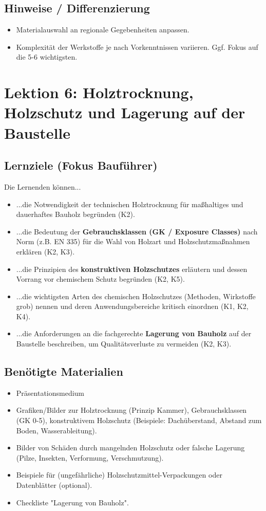 \documentclass[12pt, a4paper]{article}
\begin{document}
\subsection{Hinweise / Differenzierung}
\begin{itemize}
    \item Materialauswahl an regionale Gegebenheiten anpassen.
    \item Komplexität der Werkstoffe je nach Vorkenntnissen variieren. Ggf. Fokus auf die 5-6 wichtigsten.
\end{itemize}

\newpage

\section{Lektion 6: Holztrocknung, Holzschutz und Lagerung auf der Baustelle}
\subsection{Lernziele (Fokus Bauführer)}
Die Lernenden können...
\begin{itemize}
    \item ...die Notwendigkeit der technischen Holztrocknung für maßhaltiges und dauerhaftes Bauholz begründen (K2).
    \item ...die Bedeutung der \textbf{Gebrauchsklassen (GK / Exposure Classes)} nach Norm (z.B. EN 335) für die Wahl von Holzart und Holzschutzmaßnahmen erklären (K2, K3).
    \item ...die Prinzipien des \textbf{konstruktiven Holzschutzes} erläutern und dessen Vorrang vor chemischem Schutz begründen (K2, K5).
    \item ...die wichtigsten Arten des chemischen Holzschutzes (Methoden, Wirkstoffe grob) nennen und deren Anwendungsbereiche kritisch einordnen (K1, K2, K4).
    \item ...die Anforderungen an die fachgerechte \textbf{Lagerung von Bauholz} auf der Baustelle beschreiben, um Qualitätsverluste zu vermeiden (K2, K3).
\end{itemize}

\subsection{Benötigte Materialien}
\begin{itemize}
    \item Präsentationsmedium
    \item Grafiken/Bilder zur Holztrocknung (Prinzip Kammer), Gebrauchsklassen (GK 0-5), konstruktivem Holzschutz (Beispiele: Dachüberstand, Abstand zum Boden, Wasserableitung).
    \item Bilder von Schäden durch mangelnden Holzschutz oder falsche Lagerung (Pilze, Insekten, Verformung, Verschmutzung).
    \item Beispiele für (ungefährliche) Holzschutzmittel-Verpackungen oder Datenblätter (optional).
    \item Checkliste "Lagerung von Bauholz".
\end{itemize}
\end{document}

